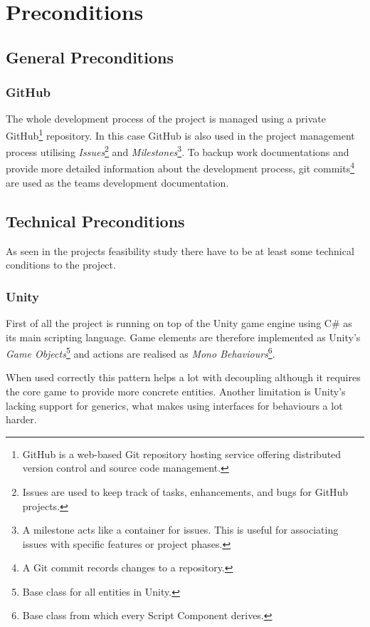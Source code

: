 \documentclass[11pt]{article}
\begin{document}
\section{Preconditions}
\subsection{General Preconditions}
\subsubsection{GitHub}\label{subsubsec:github}
The whole development process of the project is managed using a private GitHub\footnote{GitHub is a web-based Git repository hosting service offering distributed version control and source code management.} repository.
In this case GitHub is also used in the project management process utilising \textit{Issues}\footnote{Issues are used to keep track of tasks, enhancements, and bugs for GitHub projects.} and \textit{Milestones}\footnote{A milestone acts like a container for issues. This is useful for associating issues with specific features or project phases.}.
To backup work documentations and provide more detailed information about the development process, git commits\footnote{A Git commit records changes to a repository.} are used as the teams development documentation.

\subsection{Technical Preconditions}
As seen in the projects feasibility study there have to be at least some technical conditions to the project. 

\subsubsection{Unity}
First of all the project is running on top of the Unity game engine using C\# as its main scripting language. 
Game elements are therefore implemented as Unity's \textit{Game Objects}\footnote{Base class for all entities in Unity.} and actions are realised as \textit{Mono Behaviours}\footnote{Base class from which every Script Component derives.}. 

When used correctly this pattern helps a lot with decoupling although it requires the core game to provide more concrete entities.
Another limitation is Unity's lacking support for generics, what makes using interfaces for behaviours a lot harder.
\end{document}
